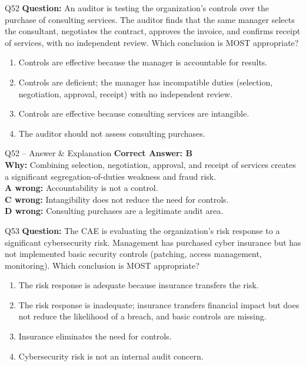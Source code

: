 \documentclass[aspectratio=169,10pt]{beamer}
\begin{document}
	\begin{frame}[t]{Q52}
		\small
		\textbf{Question:} An auditor is testing the organization's controls over the purchase of consulting services. The auditor finds that the same manager selects the consultant, negotiates the contract, approves the invoice, and confirms receipt of services, with no independent review. Which conclusion is MOST appropriate?
		\begin{enumerate}[label=\Alph*.,itemsep=1pt,topsep=2pt]
			\item Controls are effective because the manager is accountable for results.
			\item Controls are deficient; the manager has incompatible duties (selection, negotiation, approval, receipt) with no independent review.
			\item Controls are effective because consulting services are intangible.
			\item The auditor should not assess consulting purchases.
		\end{enumerate}
	\end{frame}
	
	\begin{frame}[t]{Q52 -- Answer \& Explanation}
		\small
		\textbf{Correct Answer: B} \\[4pt]
		\textbf{Why:} Combining selection, negotiation, approval, and receipt of services creates a significant segregation-of-duties weakness and fraud risk. \\[4pt]
		\textbf{A wrong:} Accountability is not a control. \\[2pt]
		\textbf{C wrong:} Intangibility does not reduce the need for controls. \\[2pt]
		\textbf{D wrong:} Consulting purchases are a legitimate audit area.
	\end{frame}
	
	\begin{frame}[t]{Q53}
		\small
		\textbf{Question:} The CAE is evaluating the organization's risk response to a significant cybersecurity risk. Management has purchased cyber insurance but has not implemented basic security controls (patching, access management, monitoring). Which conclusion is MOST appropriate?
		\begin{enumerate}[label=\Alph*.,itemsep=1pt,topsep=2pt]
			\item The risk response is adequate because insurance transfers the risk.
			\item The risk response is inadequate; insurance transfers financial impact but does not reduce the likelihood of a breach, and basic controls are missing.
			\item Insurance eliminates the need for controls.
			\item Cybersecurity risk is not an internal audit concern.
		\end{enumerate}
	\end{frame}
	
\end{document}
